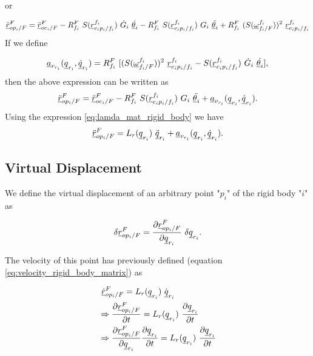 or 

\[
    \pvec{\ddot{r}}{op_{i}}{F}{F} = \pvec{\ddot{r}}{oc_{i}}{F}{F} - 
    \rot{R}{f_{i}}{F} \ S(\pvec{r}{c_{i}p_{i}}{f_i}{f_i}) \ \dot{G}_{i} \ \dot{\vecd{\theta}_{i}}
    -     \rot{R}{f_{i}}{F} \ S(\pvec{r}{c_{i}p_{i}}{f_i}{f_i}) \ {G}_{i} \ \ddot{\vecd{\theta}_{i}}
    + \rot{R}{f_{i}}{F} \ (S(\pvec{\omega}{f_{i}}{F}{f_i}))^{2} \ \pvec{r}{c_{i}p_{i}}{f_i}{f_i}  
    \]
If we define 

\begin{equation}    
\vecd{a}_{v_{r_i}}(\vecd{q}_{r_{i}}, \vecd{\dot{q}}_{r_{i}}) = 
    \rot{R}{f_{i}}{F}\ [ (S(\pvec{\omega}{f_{i}}{F}{f_i}))^{2} \ \pvec{r}{c_{i}p_{i}}{f_i}{f_i}  
    - S(\pvec{r}{c_{i}p_{i}}{f_i}{f_i}) \ \dot{G}_{i} \ \dot{\vecd{\theta}_{i}}],
    \label{coriolis_acceleration_rigid_body}
\end{equation}
then the above expression can be written as \[    \pvec{\ddot{r}}{op_{i}}{F}{F} = \pvec{\ddot{r}}{oc_{i}}{F}{F} -\rot{R}{f_{i}}{F} \ S(\pvec{r}{c_{i}p_{i}}{f_i}{f_i}) \ {G}_{i} \ \ddot{\vecd{\theta}_{i}} + \vecd{a}_{v_{r_i}}(\vecd{q}_{r_{i}}, \vecd{\dot{q}}_{r_{i}}). \] Using the expression \eqref{eq:lamda_mat_rigid_body} we have \begin{equation} \pvec{\ddot{r}}{op_{i}}{F}{F} = L_{r}(\vecd{q}_{r_{i}}) \ \vecd{\ddot{q}}_{r_{i}} + \vecd{a}_{v_{r_i}}(\vecd{q}_{r_{i}}, \vecd{\dot{q}}_{r_{i}}).
    \label{acceleration_rigid_body_matrix}
\end{equation}

\subsection{Virtual Displacement}

We define the virtual displacement of an arbitrary point "$p_{i}$" of the 
rigid body "$i$" as 

\begin{equation}
    \delta \pvec{r}{op_{i}}{F}{F} = \frac{\partial \pvec{r}{op_{i}}{F}{F}}{\partial\vecd{q}_{r_{i}}}
    \ \delta \vecd{q}_{r_{i}}.
    \label{eq:virtual_displacement_in}
\end{equation}

The velocity of this point has previously defined 
(equation \eqref{eq:velocity_rigid_body_matrix}) as 

\begin{align*}
    & \ \pvec{\dot{r}}{op_{i}}{F}{F}  = L_{r}(\vecd{q}_{r_{i}}) \ \dot{\vecd{q}}_{r_{i}} \\ 
    & \Rightarrow  \frac{\partial \pvec{r}{op_{i}}{F}{F}}{\partial t} = 
    L_{r}(\vecd{q}_{r_{i}}) \ \frac{\partial \vecd{q}_{r_{i}}}{\partial t} \\ 
    & \Rightarrow  \frac{\partial \pvec{r}{op_{i}}{F}{F}}{\partial \vecd{q}_{r_{i}}} 
    \frac{\partial \vecd{q}_{r_{i}}}{\partial t} = 
    L_{r}(\vecd{q}_{r_{i}}) \ \frac{\partial \vecd{q}_{r_{i}}}{\partial t}
\end{align*}

